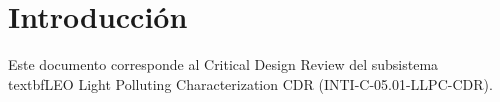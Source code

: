\section{Introducción}
Este documento corresponde al Critical Design Review del subsistema \\textbf{LEO Light Polluting Characterization CDR} (INTI-C-05.01-LLPC-CDR).
